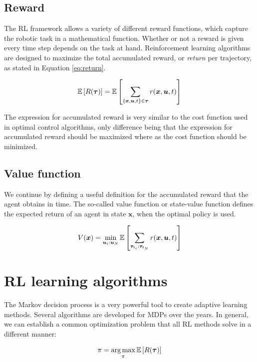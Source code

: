 \documentclass[mscThesis.tex]{subfiles}
\begin{document}
\subsection{Reward}
The RL framework allows a variety of different reward functions, which capture the robotic task in a mathematical function. Whether or not a reward is given every time step depends on the task at hand. Reinforcement learning algorithms are designed to maximize the total accumulated reward, or \emph{return} per trajectory, as stated in Equation \eqref{eq:return}. 

\begin{equation}
\operatorname*{\mathbb{E}} \left[ R(\bm{\tau}) \right] = \operatorname*{\mathbb{E}} \left[ \sum_{ \left\{\bm{x}, \bm{u}, t \right\} \in \bm{\tau}} r(\bm{x}, \bm{u}, t) \right]
\label{eq:return}
\end{equation}

The expression for accumulated reward is very similar to the cost function used in optimal control algorithms, only difference being that the expression for accumulated reward should be maximized where as the cost function should be minimized. 


\subsection{Value function}
We continue by defining a useful definition for the accumulated reward that the agent obtains in time. The so-called value function or state-value function defines the expected return of an agent in state $\bm{x}$, when the optimal policy is used. 

\begin{equation*}
V( \bm{x})=\min_{\bm{u}_i : \bm{u}_N} \operatorname*{\mathbb{E}} \left[ \sum_{\bm{\tau}_{t_i} : \bm{\tau}_{t_N}} r( \bm{x}, \bm{u}, t ) \right]
\end{equation*}

\section{RL learning algorithms}
\label{sec:RLMethods}
The Markov decision process is a very powerful tool to create adaptive learning methods. Several algorithms are developed for MDPs over the years. In general, we can establish a common optimization problem that all RL methods solve in a different manner:

\begin{equation*}
\pi = \operatorname*{arg\,max}_{\pi} \operatorname*{\mathbb{E}} \left[ R(\bm{\tau}) \right]
\end{equation*}
\end{document}
